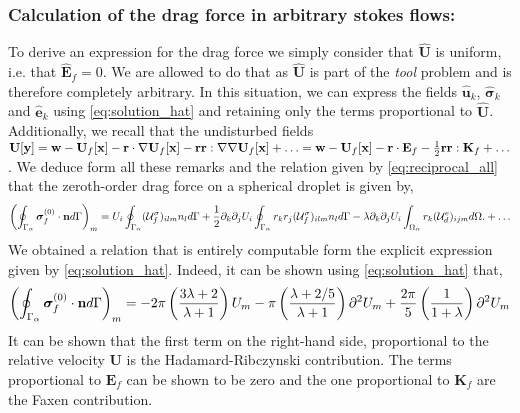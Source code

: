 \subsubsection{Calculation of the drag force in arbitrary stokes flows:}
To derive an expression for the drag force we simply consider that $\hat{\textbf{U}}$ is uniform, i.e. that $\hat{\textbf{E}}_f = 0$. 
We are allowed to do that as $\hat{\textbf{U}}$ is part of the \textit{tool} problem and is therefore completely arbitrary. 
In this situation, we can express the fields $\hat{\textbf{u}}_k$, $\hat{\bm\sigma}_k$ and $\hat{\textbf{e}}_k$ using \ref{eq:solution_hat} and retaining only the terms proportional to $\hat{\textbf{U}}$. 
Additionally, we recall that the undisturbed fields $\textbf{U}[\textbf{y}] = \textbf{w} - \textbf{U}_f[\textbf{x}] - \textbf{r}\cdot \mathbf{\nabla} \textbf{U}_f[\textbf{x}] - \textbf{rr}:\mathbf{\nabla}\mathbf{\nabla} \textbf{U}_f[\textbf{x}] + \ldots =  \textbf{w} - \textbf{U}_f[\textbf{x}] - \textbf{r}\cdot \textbf{E}_f - \frac{1}{2}\textbf{rr}: \textbf{K}_f + \ldots$.
We deduce form all these remarks and the relation  given by \ref{eq:reciprocal_all} that the zeroth-order drag force on a spherical droplet is given by, 
\begin{align*}
    \left(
        \oint_{\Gamma_{\alpha}} \bm\sigma_f^{(0)} \cdot \textbf{n} d\Gamma
    \right)_m
    = 
    U_i  \oint_{\Gamma_{\alpha}}   (\mathcal{U}_f^\sigma)_{ilm}  n_l  d\Gamma
    + \frac{1}{2}\partial_k\partial_j U_i \oint_{\Gamma_{\alpha}}  r_kr_j (\mathcal{U}_f^\sigma)_{ilm}  n_l  d\Gamma
    -\lambda \partial_k\partial_j U_i  \int_{\Omega_{\alpha}}  r_k (\mathcal{U}_d^e)_{ijm}  d\Omega. 
    + \ldots
    \label{eq:reciprocal_drag}
\end{align*}
We obtained a relation that is entirely computable form the explicit expression given by \ref{eq:solution_hat}. 
Indeed, it can be shown using \ref{eq:solution_hat} that, 
\begin{align*}
    \left(
        \oint_{\Gamma_{\alpha}} \bm\sigma_f^{(0)} \cdot \textbf{n} d\Gamma
    \right)_m
    = 
    - 2\pi\left(\frac{3\lambda +2 }{\lambda +1}\right)
    U_m  
    - \pi \left(\frac{\lambda +2/5 }{\lambda +1}\right)\partial^2 U_m 
    + \frac{2 \pi}{5} \left(\frac{1}{1+\lambda}\right) 
     \partial^2 U_m 
\end{align*}
It can be shown that the first term on the right-hand side, proportional to the relative velocity $\textbf{U}$ is the Hadamard-Ribczynski contribution. 
The terms proportional to $\textbf{E}_f$ can be shown to be zero and the one proportional to $\textbf{K}_f$ are the Faxen contribution. 
